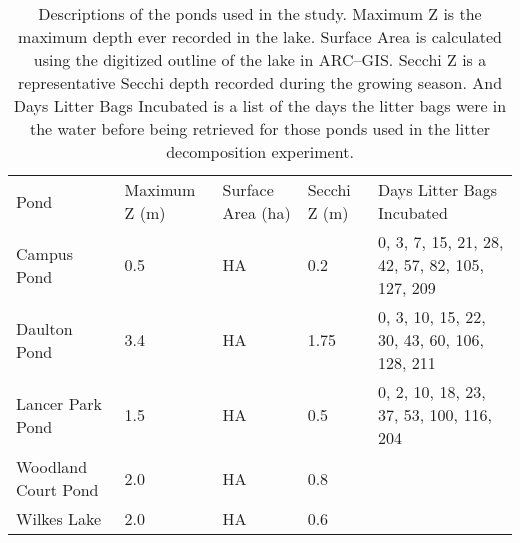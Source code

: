 \begin{table}
\label{tab:ponds}
\begin{tabular}{l l l l l}
Pond & Maximum Z (m) & Surface Area (ha) & Secchi Z (m) & Days Litter Bags Incubated \\
Campus Pond & 0.5 & HA & 0.2 & 0, 3, 7, 15, 21, 28, 42, 57, 82, 105, 127, 209\\
Daulton Pond & 3.4 & HA & 1.75 & 0, 3, 10, 15, 22, 30, 43, 60, 106, 128, 211\\
Lancer Park Pond & 1.5 & HA & 0.5 & 0, 2, 10, 18, 23, 37, 53, 100, 116, 204\\
Woodland Court Pond & 2.0 & HA & 0.8 & \\
Wilkes Lake & 2.0 & HA & 0.6 \\
\end{tabular}
\caption{Descriptions of the ponds used in the study. Maximum Z is the maximum depth ever recorded in the lake. Surface Area is calculated using the digitized outline of the lake in ARC--GIS. Secchi Z is a representative Secchi depth recorded during the growing season. And Days Litter Bags Incubated is a list of the days the litter bags were in the water before being retrieved for those ponds used in the litter decomposition experiment.}
\end{table}